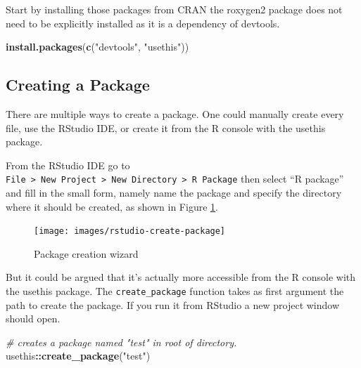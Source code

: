 \documentclass[10pt,]{krantz}
\makeatletter
\newenvironment{Shaded}{\begin{snugshade}}{\end{snugshade}}
\newcommand{\CommentTok}[1]{\textcolor[rgb]{0.37,0.37,0.37}{\textit{#1}}}
\newcommand{\KeywordTok}[1]{\textcolor[rgb]{0.27,0.27,0.27}{\textbf{#1}}}
\newcommand{\NormalTok}[1]{#1}
\newcommand{\OperatorTok}[1]{\textcolor[rgb]{0.43,0.43,0.43}{\textbf{#1}}}
\newcommand{\StringTok}[1]{\textcolor[rgb]{0.5,0.5,0.5}{#1}}
\newenvironment{kframe}{%
\medskip{}
\setlength{\fboxsep}{.8em}
 \def\at@end@of@kframe{}%
 \ifinner\ifhmode%
  \def\at@end@of@kframe{\end{minipage}}%
  \begin{minipage}{\columnwidth}%
 \fi\fi%
 \def\FrameCommand##1{\hskip\@totalleftmargin \hskip-\fboxsep
 \colorbox{shadecolor}{##1}\hskip-\fboxsep
     \hskip-\linewidth \hskip-\@totalleftmargin \hskip\columnwidth}%
 \MakeFramed {\advance\hsize-\width
   \@totalleftmargin\z@ \linewidth\hsize
   \@setminipage}}%
 {\par\unskip\endMakeFramed%
 \at@end@of@kframe}
\renewenvironment{Shaded}{\begin{kframe}}{\end{kframe}}
\makeatother
\begin{document}
Start by installing those packages from CRAN the roxygen2 package does not need to be explicitly installed as it is a dependency of devtools.

\begin{Shaded}
\begin{Highlighting}[]
\KeywordTok{install.packages}\NormalTok{(}\KeywordTok{c}\NormalTok{(}\StringTok{"devtools"}\NormalTok{, }\StringTok{"usethis"}\NormalTok{))}
\end{Highlighting}
\end{Shaded}

\hypertarget{basics-create-pkg}{%
\subsection{Creating a Package}\label{basics-create-pkg}}

There are multiple ways to create a package. One could manually create every file, use the RStudio IDE, or create it from the R console with the usethis \citep{R-usethis} package.

From the RStudio IDE go to \texttt{File\ \textgreater{}\ New\ Project\ \textgreater{}\ New\ Directory\ \textgreater{}\ R\ Package} then select ``R package'' and fill in the small form, namely name the package and specify the directory where it should be created, as shown in Figure \ref{fig:rstudio-create-package}.

\begin{figure}[H]

{\centering \texttt{[image: images/rstudio-create-package]} 

}

\caption{Package creation wizard}\label{fig:rstudio-create-package}
\end{figure}

But it could be argued that it's actually more accessible from the R console with the usethis package. The \texttt{create\_package} function takes as first argument the path to create the package. If you run it from RStudio a new project window should open.

\begin{Shaded}
\begin{Highlighting}[]
\CommentTok{# creates a package named "test" in root of directory.}
\NormalTok{usethis}\OperatorTok{::}\KeywordTok{create_package}\NormalTok{(}\StringTok{"test"}\NormalTok{)}
\end{Highlighting}
\end{Shaded}
\end{document}
